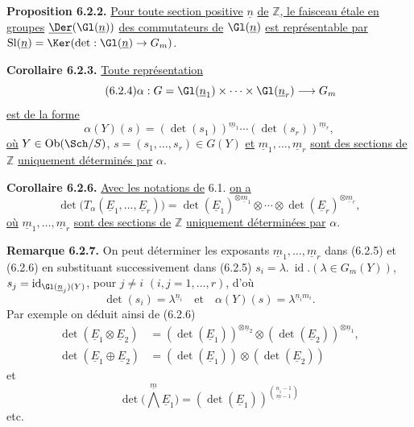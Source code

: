 
\textbf{Proposition 6.2.2.} \uline{Pour toute section positive} \(\underline{n}\) \uline{de} \(\mathbb Z\)\uline{, le faisceau étale en groupes} \(\underline{\Der}(\Gl(\underline{n}))\) \uline{des commutateurs de} \(\Gl(\underline{n})\) \uline{est représentable par}
\(\operatorname{Sl}(\underline{n})=\Ker(\det:\Gl(\underline{n})\to{G}_m)\).

\textbf{Corollaire 6.2.3.} \uline{Toute représentation}
\begin{equation}\tag{6.2.4}
 \alpha:G=\Gl(\underline{n}_1)\times\cdots\times\Gl(\underline{n}_r)\longrightarrow{G}_m
\end{equation}
\uline{est de la forme}
\begin{equation}\tag{6.2.5}
 \alpha(Y)(s)=(\det(s_1))^{\underline{m}_1}\cdots(\det(s_r))^{\underline{m}_r},
\end{equation}
\uline{où} \(Y\in\operatorname{Ob}(\Sch/S)\), \(s=(s_1,\ldots,s_r)\in G(Y)\) \uline{et} \(\underline{m}_1,\ldots,\underline{m}_r\) \uline{sont des sections de} \(\mathbb Z\) \uline{uniquement déterminés par} \(\alpha\).

\textbf{Corollaire 6.2.6.} \uline{Avec les notations de} 6.1. \uline{on a}
\[
 \det\bigl(T_\alpha(\underline{E}_1,\ldots,\underline{E}_r)\bigr)
 =
 \det(\underline{E}_1)^{\otimes \underline{m}_1}\otimes\cdots\otimes
 \det(\underline{E}_r)^{\otimes \underline{m}_r},
\]
\uline{où} \(\underline{m}_1,\ldots,\underline{m}_r\) \uline{sont des sections de} \(\mathbb Z\) \uline{uniquement déterminées par} \(\alpha\).

\textbf{Remarque 6.2.7.} On peut déterminer les exposants \(\underline{m}_1,\ldots,\underline{m}_r\) dans (6.2.5) et (6.2.6) en substituant successivement dans (6.2.5)
\(s_i=\lambda.\ \operatorname{id}.(\lambda\in{G}_m(Y))\), \(s_j=\operatorname{id}_{\Gl(\underline{n}_j)(Y)}\), pour \(j\ne i\) \((i,j=1,\ldots,r)\), d'où
\[
 \det(s_i)=\lambda^{\underline{n}_i}\quad\text{et}\quad
 \alpha(Y)(s)=\lambda^{\underline{n}_im_i}.
\]
Par exemple on déduit ainsi de (6.2.6)
\begin{align}
 \det(\underline{E}_1\otimes \underline{E}_2)&=(\det(\underline{E}_1))^{\otimes \underline{n}_2}\otimes(\det(\underline{E}_2))^{\otimes \underline{n}_1}, \tag{6.2.8}\\
 \det(\underline{E}_1\oplus \underline{E}_2)&=(\det(\underline{E}_1))\otimes(\det(\underline{E}_2)) \tag{6.2.9}
\end{align}
et
\begin{equation}\tag{6.2.10}
 \det\bigl(\bigwedge\limits^{\underline{m}} \underline{E}_1\bigr)=(\det(\underline{E}_1))^{\binom{\underline{n}_1-1}{\underline{m}-1}}
\end{equation}
etc.


